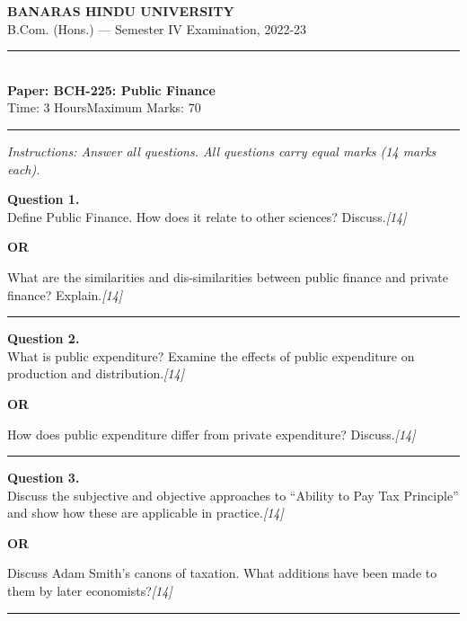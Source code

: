 \documentclass[11pt,a4paper]{article}
\newcommand{\pts}[1]{\hfill   \textit{[#1]}}
\begin{document}
\begin{center}
  {\large\bfseries BANARAS HINDU UNIVERSITY}\\[2pt]
  {\normalsize B.Com. (Hons.) --- Semester IV Examination, 2022-23}\\[6pt]
  \rule{0.8\linewidth}{0.5pt}\\[6pt]
  {\large\bfseries Paper: BCH-225: Public Finance}\\[4pt]
  {\normalsize Time: 3 Hours\hfill Maximum Marks: 70}
\end{center}

\rule{\linewidth}{0.4pt}

\smallskip



\noindent   \textit{Instructions: Answer all questions. All questions carry equal marks (14 marks each).}

\bigskip




\noindent   \textbf{Question 1.} \\
Define Public Finance. How does it relate to other sciences? Discuss.\pts{14}

\centerline{   \textbf{OR}}

What are the similarities and dis-similarities between public finance and private finance? Explain.\pts{14}

\medskip\rule{\linewidth}{0.2pt}




\noindent   \textbf{Question 2.} \\
What is public expenditure? Examine the effects of public expenditure on production and distribution.\pts{14}

\centerline{   \textbf{OR}}

How does public expenditure differ from private expenditure? Discuss.\pts{14}

\medskip\rule{\linewidth}{0.2pt}




\noindent   \textbf{Question 3.} \\
Discuss the subjective and objective approaches to ``Ability to Pay Tax Principle'' and show how these are applicable in practice.\pts{14}

\centerline{   \textbf{OR}}

Discuss Adam Smith's canons of taxation. What additions have been made to them by later economists?\pts{14}

\medskip\rule{\linewidth}{0.2pt}
\end{document}
